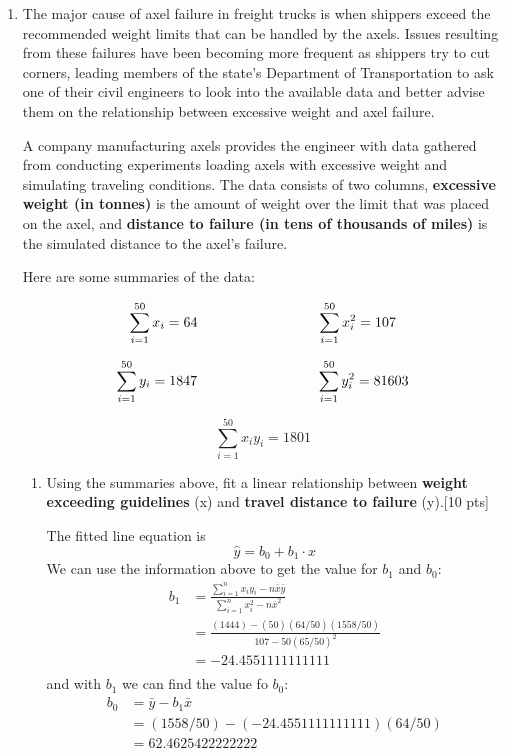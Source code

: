 \documentclass[11pt]{article}\usepackage[]{graphicx}\usepackage[]{color}
\begin{document}
\begin{enumerate}
\item
The major cause of axel failure in freight trucks is when shippers exceed the recommended weight limits that can be handled by the axels. 
Issues resulting from these failures have been becoming more frequent as shippers try to cut corners, 
leading members of the state's Department of Transportation to ask one of their civil engineers 
to look into the available data and better advise them on the relationship between excessive weight and axel failure.

A company manufacturing axels provides the engineer with data gathered from conducting experiments loading axels with excessive weight and simulating traveling conditions.
The data consists of two columns, \textbf{excessive weight (in tonnes)} is the amount of weight over the limit that was placed on the axel, and 
\textbf{distance to failure (in tens of thousands of miles)} is the simulated distance to the axel's failure. 


\begin{center}
\end{center}

Here are some summaries of the data:

$$
\sum_{i=1}^{50} x_i = 64 \hspace{3cm} \sum_{i=1}^{50} x_i^2 = 107 \\
$$

$$
\sum_{i=1}^{50} y_i = 1847 \hspace{3cm} \sum_{i=1}^{50} y_i^2 = 81603 \\
$$

$$
\sum_{i=1}^{50} x_i y_i = 1801
$$

\begin{enumerate}
       \item  Using the summaries above, fit a linear relationship between \textbf{weight exceeding guidelines} (x) and \textbf{travel distance to failure} (y).[10 pts]
       
      The fitted line equation is 
      $$
      \hat{y} = b_0 + b_1 \cdot x
      $$
      We can use the information above to get the value for $b_1$ and $b_0$:
      \begin{align*}
         b_1 &= \frac{ \sum_{i = 1}^n x_i y_i - n \bar{x} \bar{y} }{ \sum_{i = 1}^n x_i^2 - n \bar{x}^2 } \\
             &= \frac{ (1444) - (50) (64/50) (1558/50) }{ 107 - 50  (65/50)^2 } \\
             &= -24.4551111111111 \\
      \end{align*} 
      and with $b_1$ we can find the value fo $b_0$: 
      \begin{align*}
         b_0 &= \bar{y} - b_1 \bar{x} \\
             &= (1558/50) - (-24.4551111111111) (64/50) \\
             &= 62.4625422222222 \\
      \end{align*} 


\end{enumerate}
\end{enumerate}
\end{document}
